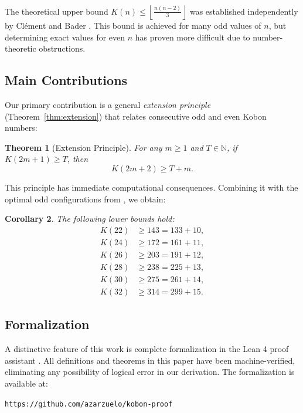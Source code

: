 \documentclass[11pt,a4paper]{article}
\theoremstyle{plain}
\newtheorem{theorem}{Theorem}[section]
\newtheorem{corollary}[theorem]{Corollary}
\theoremstyle{definition}
\theoremstyle{remark}
\newcommand{\K}{K}
\newcommand{\N}{\mathbb{N}}
\newcommand{\floor}[1]{\left\lfloor #1 \right\rfloor}
\begin{document}
The theoretical upper bound $\K(n) \leq \floor{\frac{n(n-2)}{3}}$ was established independently by Clément and Bader \cite{clement2007}. This bound is achieved for many odd values of $n$, but determining exact values for even $n$ has proven more difficult due to number-theoretic obstructions.

\subsection{Main Contributions}

Our primary contribution is a general \emph{extension principle} (Theorem~\ref{thm:extension}) that relates consecutive odd and even Kobon numbers:

\begin{theorem}[Extension Principle]
\label{thm:extension-intro}
For any $m \geq 1$ and $T \in \N$, if $\K(2m+1) \geq T$, then
\[
\K(2m+2) \geq T + m.
\]
\end{theorem}

This principle has immediate computational consequences. Combining it with the optimal odd configurations from \cite{savchuk2025,bartholdi2007,wood2026}, we obtain:

\begin{corollary}
The following lower bounds hold:
\begin{align*}
\K(22) &\geq 143 = 133 + 10, \\
\K(24) &\geq 172 = 161 + 11, \\
\K(26) &\geq 203 = 191 + 12, \\
\K(28) &\geq 238 = 225 + 13, \\
\K(30) &\geq 275 = 261 + 14, \\
\K(32) &\geq 314 = 299 + 15.
\end{align*}
\end{corollary}

\subsection{Formalization}

A distinctive feature of this work is complete formalization in the Lean 4 proof assistant \cite{moura2021lean}. All definitions and theorems in this paper have been machine-verified, eliminating any possibility of logical error in our derivation. The formalization is available at:

\begin{center}
\texttt{https://github.com/azarzuelo/kobon-proof}
\end{center}
\end{document}

